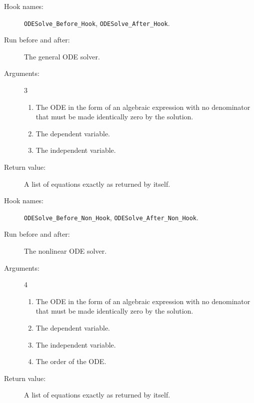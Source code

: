 \noindent\hrulefill

\begin{description}
\item[Hook names:] \verb|ODESolve_Before_Hook|,
\verb|ODESolve_After_Hook|.
\item[Run before and after:] The general ODE solver.
\item[Arguments:] 3
\begin{enumerate}
\item The ODE in the form of an algebraic expression with no
denominator that must be made identically zero by the solution.
\item The dependent variable.
\item The independent variable.
\end{enumerate}
\item[Return value:] A list of equations exactly as returned by
 itself.
\end{description}

\noindent\hrulefill

\begin{description}
\item[Hook names:] \verb|ODESolve_Before_Non_Hook|,
\verb|ODESolve_After_Non_Hook|.
\item[Run before and after:] The nonlinear ODE solver.
\item[Arguments:] 4
\begin{enumerate}
\item The ODE in the form of an algebraic expression with no
denominator that must be made identically zero by the solution.
\item The dependent variable.
\item The independent variable.
\item The order of the ODE.
\end{enumerate}
\item[Return value:] A list of equations exactly as returned by
 itself.
\end{description}

\noindent\hrulefill
\pagebreak

